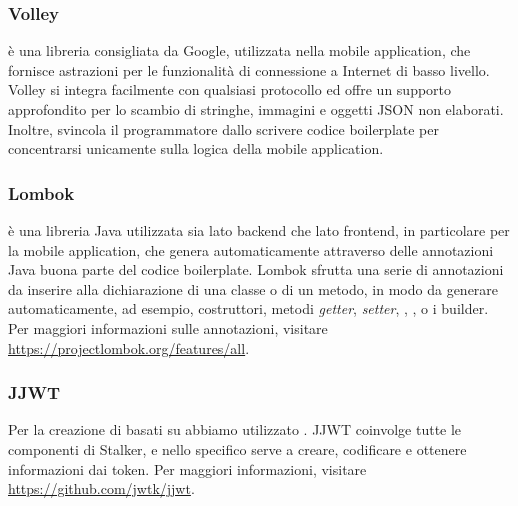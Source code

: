 \documentclass[../../../manuale-manutentore.tex]{subfiles}
\begin{document}
\subsubsection{Volley}%
\label{subs:volley}

 è una libreria consigliata da Google, utilizzata nella mobile application, che fornisce astrazioni per le funzionalità di connessione a Internet di basso livello.
Volley si integra facilmente con qualsiasi protocollo ed offre un supporto approfondito per lo scambio di stringhe, immagini e oggetti JSON non elaborati.
Inoltre, svincola il programmatore dallo scrivere codice boilerplate per concentrarsi unicamente sulla logica della mobile application.

\subsubsection{Lombok}%
\label{subs:lombok}

 è una libreria Java utilizzata sia lato backend che lato frontend, in particolare per la mobile application, che genera automaticamente attraverso delle annotazioni Java buona parte del codice boilerplate.
Lombok sfrutta una serie di annotazioni da inserire alla dichiarazione di una classe o di un metodo, in modo da generare automaticamente, ad esempio, costruttori, metodi \textit{getter}, \textit{setter}, , , o i builder.
Per maggiori informazioni sulle annotazioni, visitare \href{https://projectlombok.org/features/all}{https://projectlombok.org/features/all}.

\subsubsection{JJWT}%
\label{subs:jjwt}

Per la creazione di  basati su  abbiamo utilizzato .
JJWT coinvolge tutte le componenti di Stalker, e nello specifico serve a creare, codificare e ottenere informazioni dai token.
Per maggiori informazioni, visitare \href{https://github.com/jwtk/jjwt}{https://github.com/jwtk/jjwt}.
\end{document}
